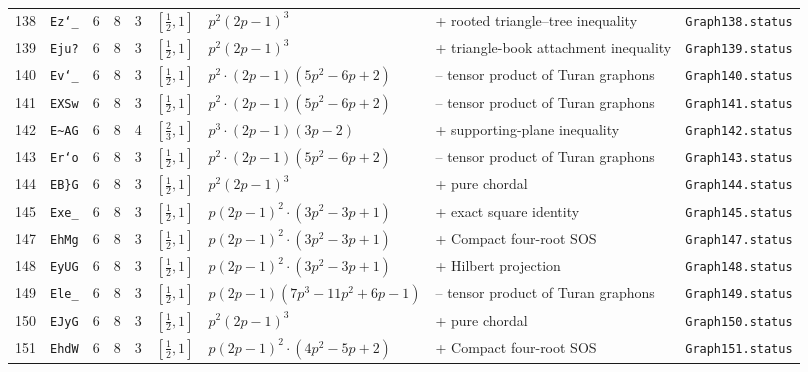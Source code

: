 \begin{landscape}
\begin{longtable}{r l r r r l p{4.0cm} p{3.5cm} p{2.7cm}}
138 & \texttt{Ez`\_} & 6 & 8 & 3 & $[\frac{1}{2},1]$ & $p^{2} \left(2 p - 1\right)^{3}$ & + rooted triangle--tree inequality & \texttt{Graph138.status}\\
139 & \texttt{Eju?} & 6 & 8 & 3 & $[\frac{1}{2},1]$ & $p^{2} \left(2 p - 1\right)^{3}$ & + triangle-book attachment inequality & \texttt{Graph139.status}\\
140 & \texttt{Ev`\_} & 6 & 8 & 3 & $[\frac{1}{2},1]$ & $p^{2} \cdot \left(2 p - 1\right) \left(5 p^{2} - 6 p + 2\right)$ & -- tensor product of Turan graphons & \texttt{Graph140.status}\\
141 & \texttt{EXSw} & 6 & 8 & 3 & $[\frac{1}{2},1]$ & $p^{2} \cdot \left(2 p - 1\right) \left(5 p^{2} - 6 p + 2\right)$ & -- tensor product of Turan graphons & \texttt{Graph141.status}\\
142 & \texttt{E\textasciitilde{}AG} & 6 & 8 & 4 & $[\frac{2}{3},1]$ & $p^{3} \cdot \left(2 p - 1\right) \left(3 p - 2\right)$ & + supporting-plane inequality & \texttt{Graph142.status}\\
143 & \texttt{Er`o} & 6 & 8 & 3 & $[\frac{1}{2},1]$ & $p^{2} \cdot \left(2 p - 1\right) \left(5 p^{2} - 6 p + 2\right)$ & -- tensor product of Turan graphons & \texttt{Graph143.status}\\
144 & \texttt{EB\}G} & 6 & 8 & 3 & $[\frac{1}{2},1]$ & $p^{2} \left(2 p - 1\right)^{3}$ & + pure chordal & \texttt{Graph144.status}\\
145 & \texttt{Exe\_} & 6 & 8 & 3 & $[\frac{1}{2},1]$ & $p \left(2 p - 1\right)^{2} \cdot \left(3 p^{2} - 3 p + 1\right)$ & + exact square identity & \texttt{Graph145.status}\\
147 & \texttt{EhMg} & 6 & 8 & 3 & $[\frac{1}{2},1]$ & $p \left(2 p - 1\right)^{2} \cdot \left(3 p^{2} - 3 p + 1\right)$ & + Compact four-root SOS & \texttt{Graph147.status}\\
148 & \texttt{EyUG} & 6 & 8 & 3 & $[\frac{1}{2},1]$ & $p \left(2 p - 1\right)^{2} \cdot \left(3 p^{2} - 3 p + 1\right)$ & + Hilbert projection & \texttt{Graph148.status}\\
149 & \texttt{Ele\_} & 6 & 8 & 3 & $[\frac{1}{2},1]$ & $p \left(2 p - 1\right) \left(7 p^{3} - 11 p^{2} + 6 p - 1\right)$ & -- tensor product of Turan graphons & \texttt{Graph149.status}\\
150 & \texttt{EJyG} & 6 & 8 & 3 & $[\frac{1}{2},1]$ & $p^{2} \left(2 p - 1\right)^{3}$ & + pure chordal & \texttt{Graph150.status}\\
151 & \texttt{EhdW} & 6 & 8 & 3 & $[\frac{1}{2},1]$ & $p \left(2 p - 1\right)^{2} \cdot \left(4 p^{2} - 5 p + 2\right)$ & + Compact four-root SOS & \texttt{Graph151.status}\\

\end{longtable}
\end{landscape}

